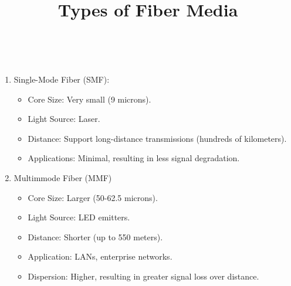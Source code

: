 \documentclass[a4paper,11pt]{article}
\begin{document}
\title{Types of Fiber Media}\\
\begin{enumerate}
    \item Single-Mode Fiber (SMF):
    \begin{itemize}
        \item Core Size: Very small (9 microns).\\
        \item Light Source: Laser.\\
        \item Distance: Support long-distance transmissions (hundreds of kilometers).\\
        \item Applications: Minimal, resulting in less signal degradation.\\
    \end{itemize}
    \item Multimmode Fiber (MMF)
    \begin{itemize}
        \item Core Size: Larger (50-62.5 microns).\\
        \item Light Source: LED emitters.\\
        \item Distance: Shorter (up to 550 meters).\\
        \item Application: LANs, enterprise networks.\\
        \item Dispersion: Higher, resulting in greater signal loss over distance.\\
    \end{itemize}
\end{enumerate}
\end{document}

